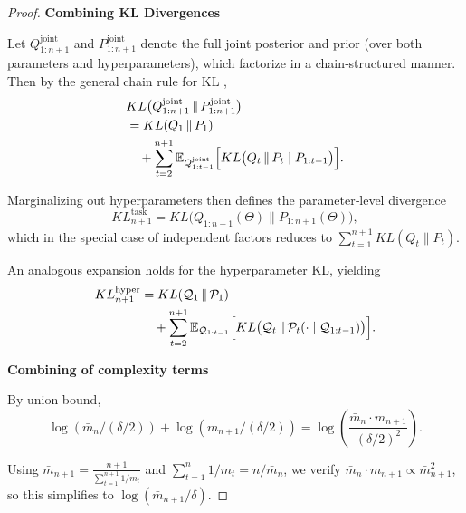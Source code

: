 \documentclass[letterpaper]{article} %
\begin{document}
\begin{proof}
\textbf{Combining KL Divergences}


Let \(Q^{\mathrm{joint}}_{1:n+1}\) and \(P^{\mathrm{joint}}_{1:n+1}\) denote the full joint posterior and prior (over both parameters and hyperparameters), which factorize in a chain‐structured manner.  Then by the general chain rule for KL ,
\begin{equation}
\begin{aligned}
&KL\bigl(Q^{\mathrm{joint}}_{1:n+1} \,\|\, P^{\mathrm{joint}}_{1:n+1}\bigr) \\
&= KL(Q_1 \,\|\, P_1) \\
&\quad + \sum_{t=2}^{n+1} 
\mathbb{E}_{Q^{\mathrm{joint}}_{1:t-1}} \Bigl[
KL\bigl(Q_t \,\|\, P_t \mid P_{1:t-1}\bigr)
\Bigr]. \notag
\end{aligned}
\end{equation}



Marginalizing out hyperparameters then defines the parameter‐level divergence
\[
KL^{\mathrm{task}}_{n+1}
=KL\bigl(Q_{1:n+1}(\Theta)\big\|P_{1:n+1}(\Theta)\bigr),
\]
which in the special case of independent factors reduces to \(\sum_{t=1}^{n+1}KL(Q_t\|P_t)\).

An analogous expansion holds for the hyperparameter KL, yielding
\begin{equation}
\begin{aligned}
KL^{\mathrm{hyper}}_{n+1}
&= KL(\mathcal Q_1 \,\|\, \mathcal P_1) \\
&\quad + \sum_{t=2}^{n+1} \mathbb{E}_{\mathcal Q_{1:t-1}}
\Bigl[ KL\bigl(\mathcal Q_t \,\|\, \mathcal P_t(\cdot \mid \mathcal Q_{1:t-1})\bigr) \Bigr].
\end{aligned} \notag
\end{equation}


\textbf{Combining of complexity terms}

By union bound,     
$$\log(\bar{m}_n/(\delta/2)) + \log(m_{n+1}/(\delta/2)) = \log\left( \frac{\bar{m}_n \cdot m_{n+1}}{(\delta/2)^2} \right).$$    

Using $\bar{m}_{n+1} = \frac{n+1}{\sum_{t=1}^{n+1} 1/m_t}$ and $\sum_{t=1}^n 1/m_t = n/\bar{m}_n$, we verify $\bar{m}_n \cdot m_{n+1} \propto \bar{m}_{n+1}^2$, so this simplifies to $\log(\bar{m}_{n+1}/\delta)$.  


\end{proof}
\end{document}
